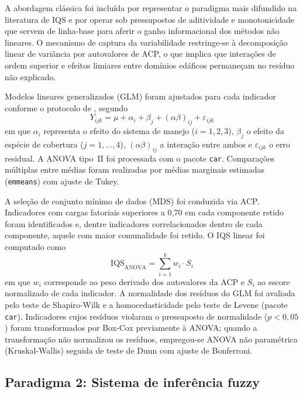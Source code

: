 \documentclass[pdflatex,sn-basic]{sn-jnl}%
\begin{document}
A abordagem clássica foi incluída por representar o paradigma mais difundido na literatura de IQS e por operar sob pressupostos de aditividade e monotonicidade que servem de linha-base para aferir o ganho informacional dos métodos não lineares. O mecanismo de captura da variabilidade restringe-se à decomposição linear de variância por autovalores de ACP, o que implica que interações de ordem superior e efeitos limiares entre domínios edáficos permaneçam no resíduo não explicado.

Modelos lineares generalizados (GLM) foram ajustados para cada indicador conforme o protocolo de \cite{Andrews2002}, segundo
\begin{equation}
Y_{ijk} = \mu + \alpha_i + \beta_j + (\alpha\beta)_{ij} + \varepsilon_{ijk}
\label{eq:glm}
\end{equation}
em que $\alpha_i$ representa o efeito do sistema de manejo ($i = 1, 2, 3$), $\beta_j$ o efeito da espécie de cobertura ($j = 1, \ldots, 4$), $(\alpha\beta)_{ij}$ a interação entre ambos e $\varepsilon_{ijk}$ o erro residual. A ANOVA tipo~II foi processada com o pacote \texttt{car}. Comparações múltiplas entre médias foram realizadas por médias marginais estimadas (\texttt{emmeans}) com ajuste de Tukey.

A seleção de conjunto mínimo de dados (MDS) foi conduzida via ACP. Indicadores com cargas fatoriais superiores a 0,70 em cada componente retido foram identificados e, dentre indicadores correlacionados dentro de cada componente, aquele com maior comunalidade foi retido. O IQS linear foi computado como
\begin{equation}
\text{IQS}_{\text{ANOVA}} = \sum_{i=1}^{k} w_i \cdot S_i
\label{eq:sqi_anova}
\end{equation}
em que $w_i$ corresponde ao peso derivado dos autovalores da ACP e $S_i$ ao escore normalizado de cada indicador. A normalidade dos resíduos do GLM foi avaliada pelo teste de Shapiro-Wilk e a homocedasticidade pelo teste de Levene (pacote \texttt{car}). Indicadores cujos resíduos violaram o pressuposto de normalidade ($p < 0{,}05$) foram transformados por Box-Cox previamente à ANOVA; quando a transformação não normalizou os resíduos, empregou-se ANOVA não paramétrica (Kruskal-Wallis) seguida de teste de Dunn com ajuste de Bonferroni.

\subsection{Paradigma 2: Sistema de inferência fuzzy}\label{subsec:fuzzy}
\end{document}
